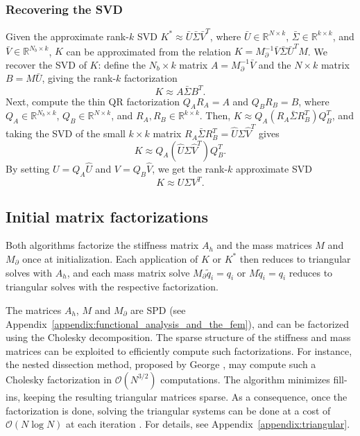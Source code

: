 \subsubsection{Recovering the SVD}\label{sec:reconvering_the_svd}
Given the approximate rank-$k$ SVD $K^* \approx \bar{U}\bar{\Sigma}\bar{V}^T$, where $\bar U \in \mathbb{R}^{N \times k}$, $\bar \Sigma \in \mathbb{R}^{k \times k}$, and $\bar V \in \mathbb{R}^{N_b \times k}$, $K$ can be approximated from the relation $K = M_\partial^{-1} \bar V \bar \Sigma \bar U^T M$. We recover the SVD of $K$: define the $N_b \times k$ matrix $A = M_\partial^{-1} \bar V$ and the $N \times k$ matrix $B = M \bar U$, giving the rank-$k$ factorization
\begin{equation*}
    K \approx A \bar \Sigma B^T.
\end{equation*}
Next, compute the thin QR factorization $Q_A R_A = A$ and $Q_B R_B = B$, where $Q_A \in \mathbb{R}^{N_b \times k}$, $Q_B \in \mathbb{R}^{N \times k}$, and $R_A, R_B \in \mathbb{R}^{k \times k}$. Then, $K \approx Q_A (R_A \bar \Sigma R_B^T) Q_B^T$, and taking the SVD of the small $k \times k$ matrix $R_A \bar \Sigma R_B^T = \hat U \Sigma \hat V^T$ gives 
\begin{equation*}
    K \approx Q_A (\hat U \Sigma \hat V^T) Q_B^T.
\end{equation*}
By setting $U = Q_A \hat U$ and $V = Q_B \hat V$, we get the rank-$k$ approximate SVD
\begin{equation*}
    K \approx U \Sigma V^T.
\end{equation*}


\subsection{Initial matrix factorizations}\label{sec:initial_matrix_factorizations}
Both algorithms factorize the stiffness matrix $A_h$ and the mass matrices $M$ and $M_\partial$ once at initialization. Each application of $K$ or $K^*$ then reduces to triangular solves with $A_h$, and each mass matrix solve $M_\partial \tilde{q}_i = q_i$ or $M\tilde{q}_i = q_i$ reduces to triangular solves with the respective factorization.

The matrices $A_h$, $M$ and $M_\partial$ are SPD (see Appendix~\ref{appendix:functional_analysis_and_the_fem}), and can be factorized using the Cholesky decomposition. The sparse structure of the stiffness and mass matrices can be exploited to efficiently compute such factorizations. For instance, the nested dissection method, proposed by George \cite{georgeNestedDissectionRegular1973}, may compute such a Cholesky factorization in $\mathcal{O}(N^{3/2})$ computations. The algorithm minimizes fill-ins, keeping the resulting triangular matrices sparse. As a consequence, once the factorization is done, solving the triangular systems can be done at a cost of $\mathcal{O}(N \log N)$ at each iteration \cite{georgeComputerSolutionLarge1984,liptonGeneralizedNestedDissection1979}. For details, see Appendix~\ref{appendix:triangular}.

